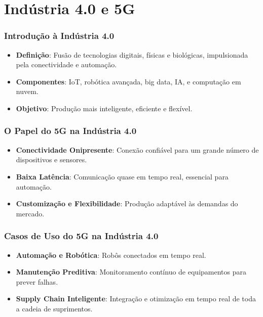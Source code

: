 \section{Indústria 4.0 e 5G}
\begin{frame}
    \frametitle{Introdução à Indústria 4.0}
    \begin{itemize}
        \item \textbf{Definição}: Fusão de tecnologias digitais, físicas e biológicas, impulsionada pela conectividade e automação.
        \item \textbf{Componentes}: IoT, robótica avançada, big data, IA, e computação em nuvem.
        \item \textbf{Objetivo}: Produção mais inteligente, eficiente e flexível.
    \end{itemize}
\end{frame}

\begin{frame}
    \frametitle{O Papel do 5G na Indústria 4.0}
    \begin{itemize}
        \item \textbf{Conectividade Onipresente}: Conexão confiável para um grande número de dispositivos e sensores.
        \item \textbf{Baixa Latência}: Comunicação quase em tempo real, essencial para automação.
        \item \textbf{Customização e Flexibilidade}: Produção adaptável às demandas do mercado.
    \end{itemize}
\end{frame}

\begin{frame}
    \frametitle{Casos de Uso do 5G na Indústria 4.0}
    \begin{itemize}
        \item \textbf{Automação e Robótica}: Robôs conectados em tempo real.
        \item \textbf{Manutenção Preditiva}: Monitoramento contínuo de equipamentos para prever falhas.
        \item \textbf{Supply Chain Inteligente}: Integração e otimização em tempo real de toda a cadeia de suprimentos.
    \end{itemize}
\end{frame}

